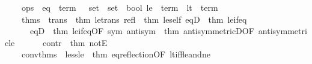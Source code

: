 \begin{isabellebody}
\ \ \ \ ops\ {\isacharequal}{\kern0pt}\ {\isacharbraceleft}{\kern0pt}eq\ {\isacharequal}{\kern0pt}\ {\isacharat}{\kern0pt}{\isacharbraceleft}{\kern0pt}term\ {\isasymopen}{\isacharparenleft}{\kern0pt}{\isacharequal}{\kern0pt}{\isacharparenright}{\kern0pt}\ {\isacharcolon}{\kern0pt}{\isacharcolon}{\kern0pt}\ set\ {\isasymRightarrow}\ set\ {\isasymRightarrow}\ bool{\isasymclose}{\isacharbraceright}{\kern0pt}{\isacharcomma}{\kern0pt}\ le\ {\isacharequal}{\kern0pt}\ {\isacharat}{\kern0pt}{\isacharbraceleft}{\kern0pt}term\ {\isasymopen}{\isacharparenleft}{\kern0pt}{\isasymle}{\isacharparenright}{\kern0pt}{\isasymclose}{\isacharbraceright}{\kern0pt}{\isacharcomma}{\kern0pt}\ lt\ {\isacharequal}{\kern0pt}\ {\isacharat}{\kern0pt}{\isacharbraceleft}{\kern0pt}term\ {\isasymopen}{\isacharparenleft}{\kern0pt}{\isacharless}{\kern0pt}{\isacharparenright}{\kern0pt}{\isasymclose}{\isacharbraceright}{\kern0pt}{\isacharbraceright}{\kern0pt}{\isacharcomma}{\kern0pt}\isanewline
\ \ \ \ thms\ {\isacharequal}{\kern0pt}\ {\isacharbraceleft}{\kern0pt}trans\ {\isacharequal}{\kern0pt}\ {\isacharat}{\kern0pt}{\isacharbraceleft}{\kern0pt}thm\ le{\isacharunderscore}{\kern0pt}trans{\isacharbraceright}{\kern0pt}{\isacharcomma}{\kern0pt}\ refl\ {\isacharequal}{\kern0pt}\ {\isacharat}{\kern0pt}{\isacharbraceleft}{\kern0pt}thm\ le{\isacharunderscore}{\kern0pt}self{\isacharbraceright}{\kern0pt}{\isacharcomma}{\kern0pt}\ eqD{}\ {\isacharequal}{\kern0pt}\ {\isacharat}{\kern0pt}{\isacharbraceleft}{\kern0pt}thm\ le{\isacharunderscore}{\kern0pt}if{\isacharunderscore}{\kern0pt}eq{\isacharbraceright}{\kern0pt}{\isacharcomma}{\kern0pt}\isanewline
\ \ \ \ \ \ eqD{}\ {\isacharequal}{\kern0pt}\ {\isacharat}{\kern0pt}{\isacharbraceleft}{\kern0pt}thm\ le{\isacharunderscore}{\kern0pt}if{\isacharunderscore}{\kern0pt}eq{\isacharbrackleft}{\kern0pt}OF\ sym{\isacharbrackright}{\kern0pt}{\isacharbraceright}{\kern0pt}{\isacharcomma}{\kern0pt}\ antisym\ {\isacharequal}{\kern0pt}\ {\isacharat}{\kern0pt}{\isacharbraceleft}{\kern0pt}thm\ antisymmetricD{\isacharbrackleft}{\kern0pt}OF\ antisymmetric{\isacharunderscore}{\kern0pt}le{\isacharbrackright}{\kern0pt}{\isacharbraceright}{\kern0pt}{\isacharcomma}{\kern0pt}\isanewline
\ \ \ \ \ \ contr\ {\isacharequal}{\kern0pt}\ {\isacharat}{\kern0pt}{\isacharbraceleft}{\kern0pt}thm\ notE{\isacharbraceright}{\kern0pt}{\isacharbraceright}{\kern0pt}{\isacharcomma}{\kern0pt}\isanewline
\ \ \ \ conv{\isacharunderscore}{\kern0pt}thms\ {\isacharequal}{\kern0pt}\ {\isacharbraceleft}{\kern0pt}less{\isacharunderscore}{\kern0pt}le\ {\isacharequal}{\kern0pt}\ {\isacharat}{\kern0pt}{\isacharbraceleft}{\kern0pt}thm\ eq{\isacharunderscore}{\kern0pt}reflection{\isacharbrackleft}{\kern0pt}OF\ lt{\isacharunderscore}{\kern0pt}iff{\isacharunderscore}{\kern0pt}le{\isacharunderscore}{\kern0pt}and{\isacharunderscore}{\kern0pt}ne{\isacharbrackright}{\kern0pt}{\isacharbraceright}{\kern0pt}{\isacharcomma}{\kern0pt}\isanewline

\end{isabellebody}
